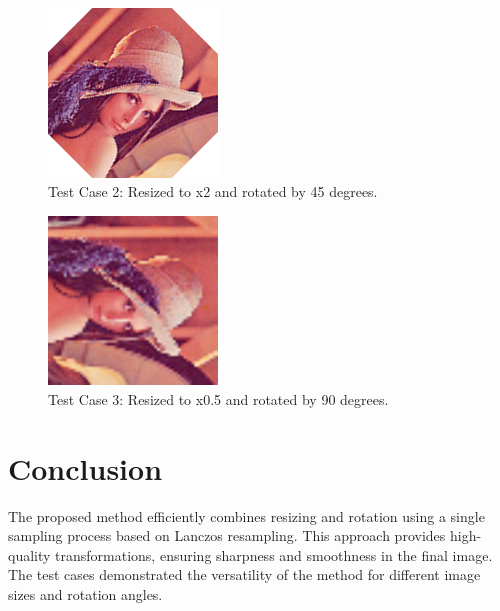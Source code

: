 \documentclass{article}
\begin{document}
\begin{figure}[h!]
    \centering
    \includegraphics[width=0.4\textwidth]{lena_2.00@45.00.png}
    \caption{Test Case 2: Resized to x2 and rotated by 45 degrees.}
\end{figure}

\begin{figure}[h!]
    \centering
    \includegraphics[width=0.4\textwidth]{lena_0.50@90.00.png}
    \caption{Test Case 3: Resized to x0.5 and rotated by 90 degrees.}
\end{figure}

\section{Conclusion}

The proposed method efficiently combines resizing and rotation using a single sampling process based on Lanczos resampling. This approach provides high-quality transformations, ensuring sharpness and smoothness in the final image. The test cases demonstrated the versatility of the method for different image sizes and rotation angles.
\end{document}
